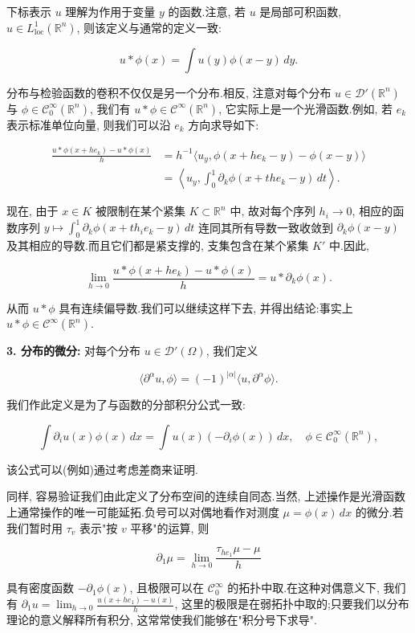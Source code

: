 下标表示 $u$ 理解为作用于变量 $y$ 的函数.注意, 若 $u$ 是局部可积函数, $u\in L^1_{\mathrm{loc}}(\mathbb{R}^n)$, 则该定义与通常的定义一致:

\[
u*\phi(x) = \int u(y)\phi(x-y)\, dy.
\]

\begin{remark*}
分布与检验函数的卷积不仅仅是另一个分布.相反, 注意对每个分布 $u\in\mathcal{D}'(\mathbb{R}^n)$ 与 $\phi\in\mathcal{C}_0^{\infty}(\mathbb{R}^n)$, 我们有 $u*\phi\in\mathcal{C}^{\infty}(\mathbb{R}^n)$, 它实际上是一个光滑函数.例如, 若 $e_k$ 表示标准单位向量, 则我们可以沿 $e_k$ 方向求导如下:

\[
\begin{aligned}
\frac{u*\phi(x+he_k) - u*\phi(x)}{h} &= h^{-1}\langle u_y, \phi(x+he_k-y) - \phi(x-y)\rangle \\
&= \left\langle u_y, \int_0^1\partial_k\phi(x+the_k-y)\, dt\right\rangle.
\end{aligned}
\]

现在, 由于 $x\in K$ 被限制在某个紧集 $K\subset\mathbb{R}^n$ 中, 故对每个序列 $h_i\to 0$, 相应的函数序列 $y\mapsto\int_0^1\partial_k\phi(x+th_ie_k-y)\, dt$ 连同其所有导数一致收敛到 $\partial_k\phi(x-y)$ 及其相应的导数.而且它们都是紧支撑的, 支集包含在某个紧集 $K'$ 中.因此,

\[
\lim_{h\to 0}\frac{u*\phi(x+he_k) - u*\phi(x)}{h} = u*\partial_k\phi(x).
\]

从而 $u*\phi$ 具有连续偏导数.我们可以继续这样下去, 并得出结论:事实上 $u*\phi\in\mathcal{C}^{\infty}(\mathbb{R}^n)$.
\end{remark*}

\textbf{3. 分布的微分:} 对每个分布 $u\in\mathcal{D}'(\Omega)$, 我们定义

\[
\langle\partial^{\alpha}u, \phi\rangle = (-1)^{|\alpha|}\langle u, \partial^{\alpha}\phi\rangle.
\]

我们作此定义是为了与函数的分部积分公式一致:

\[
\int\partial_i u(x)\phi(x)\, dx = \int u(x)(-\partial_i\phi(x))\, dx, \quad \phi\in\mathcal{C}_0^{\infty}(\mathbb{R}^n),
\]

该公式可以(例如)通过考虑差商来证明.

同样, 容易验证我们由此定义了分布空间的连续自同态.当然, 上述操作是光滑函数上通常操作的唯一可能延拓.负号可以对偶地看作对测度 $\mu = \phi(x)\, dx$ 的微分.若我们暂时用 $\tau_v$ 表示"按 $v$ 平移"的运算, 则

\[
\partial_1\mu = \lim_{h\to 0}\frac{\tau_{he_1}\mu - \mu}{h}
\]

具有密度函数 $-\partial_1\phi(x)$, 且极限可以在 $\mathcal{C}_0^{\infty}$ 的拓扑中取.在这种对偶意义下, 我们有 $\partial_1u = \lim_{h\to 0}\frac{u(x+he_1)-u(x)}{h}$, 这里的极限是在弱拓扑中取的;只要我们以分布理论的意义解释所有积分, 这常常使我们能够在"积分号下求导".

